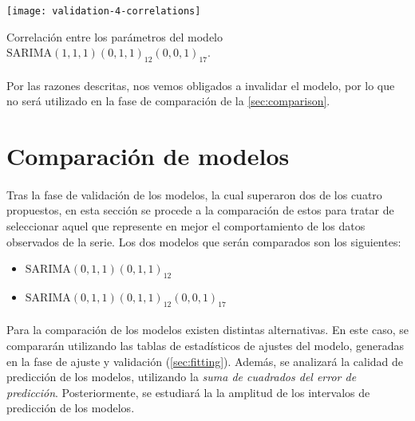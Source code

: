 \documentclass[a4paper, spanish]{article}
\begin{document}
      \begin{table}[htb!]
        \centering
        \texttt{[image: validation-4-correlations]}
        \caption{Correlación entre los parámetros del modelo $\text{SARIMA}(1, 1, 1)(0, 1, 1)_{12}(0, 0, 1)_{17}$.}
        \label{table:validation_4_correlations}
      \end{table}

      \paragraph{}
      Por las razones descritas, nos vemos obligados a invalidar el modelo, por lo que no será utilizado en la fase de comparación de la \autoref{sec:comparison}.

  \section{Comparación de modelos}
  \label{sec:comparison}

    \paragraph{}
    Tras la fase de validación de los modelos, la cual superaron dos de los cuatro propuestos, en esta sección se procede a la comparación de estos para tratar de seleccionar aquel que represente en mejor el comportamiento de los datos observados de la serie. Los dos modelos que serán comparados son los siguientes:

    \begin{itemize}
      \item $\text{SARIMA}(0, 1, 1)(0, 1, 1)_{12}$
      \item $\text{SARIMA}(0, 1, 1)(0, 1, 1)_{12}(0, 0, 1)_{17}$
    \end{itemize}

    \paragraph{}
    Para la comparación de los modelos existen distintas alternativas. En este caso, se compararán utilizando las tablas de estadísticos de ajustes del modelo, generadas en la fase de ajuste y validación (\autoref{sec:fitting}). Además, se analizará la calidad de predicción de los modelos, utilizando la \emph{suma de cuadrados del error de predicción}. Posteriormente, se estudiará la la amplitud de los intervalos de predicción de los modelos.
\end{document}
